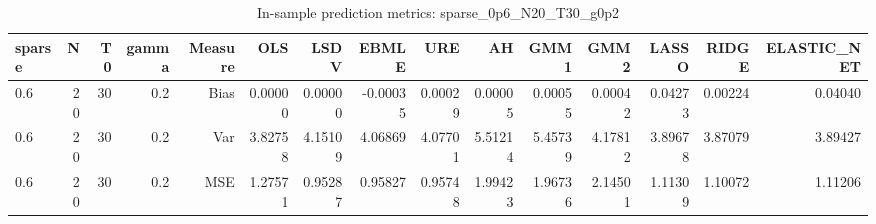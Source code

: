 \begin{table}[!htbp]\centering
\caption{In-sample prediction metrics: sparse_0p6_N20_T30_g0p2}
\label{tab:table2_sparse_0p6_N20_T30_g0p2}
\begin{tabular}{lrrrrrrrrrrrrrr}
\hline
sparse & N & T0 & gamma & Measure & OLS & LSDV & EBMLE & URE & AH & GMM1 & GMM2 & LASSO & RIDGE & ELASTIC_NET \\
\hline
0.6 & 20 & 30 & 0.2 & Bias & 0.00000 & 0.00000 & -0.00035 & 0.00029 & 0.00005 & 0.00055 & 0.00042 & 0.04273 & 0.00224 & 0.04040 \\
0.6 & 20 & 30 & 0.2 & Var & 3.82758 & 4.15109 & 4.06869 & 4.07701 & 5.51214 & 5.45739 & 4.17812 & 3.89678 & 3.87079 & 3.89427 \\
0.6 & 20 & 30 & 0.2 & MSE & 1.27571 & 0.95287 & 0.95827 & 0.95748 & 1.99423 & 1.96736 & 2.14501 & 1.11309 & 1.10072 & 1.11206 \\
\hline
\end{tabular}
\end{table}

